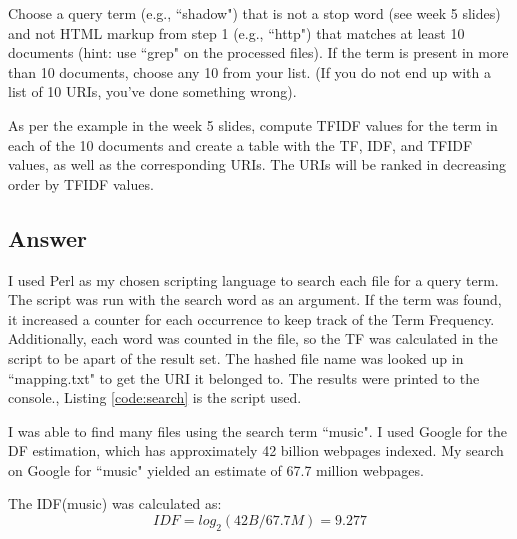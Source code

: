 \documentclass[12pt]{scrartcl} %
\begin{document}
Choose a query term (e.g., ``shadow") that is not a stop word
(see week 5 slides) and not HTML markup from step 1 (e.g., ``http")
that matches at least 10 documents (hint: use ``grep" on the processed
files).  If the term is present in more than 10 documents, choose
any 10 from your list.  (If you do not end up with a list of 10
URIs, you've done something wrong).

As per the example in the week 5 slides, compute TFIDF values for
the term in each of the 10 documents and create a table with the
TF, IDF, and TFIDF values, as well as the corresponding URIs.  The
URIs will be ranked in decreasing order by TFIDF values.

\subsection{Answer}
I used Perl as my chosen scripting language to search each file for a query term.
The script was run with the search word as an argument.
If the term was found, it increased a counter for each occurrence to keep track of the Term Frequency.
Additionally, each word was counted in the file, so the TF was calculated in the script to be apart of the result set.
The hashed file name was looked up in ``mapping.txt" to get the URI it belonged to.
The results were printed to the console.\cite{bib-ptext},\cite{bib-psearch}
Listing \ref{code:search} is the script used. \\



I was able to find many files using the search term ``music".  
I used Google for the DF estimation, which has approximately 42 billion webpages indexed.\cite{bib-size}
My search on Google for ``music" yielded an estimate of 67.7 million webpages.

The IDF(music) was calculated as:
\[
IDF = log_2(42B/67.7M) = 9.277
\]
\end{document}
